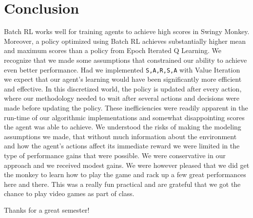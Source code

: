 \documentclass[11pt, oneside]{article}   	%
\begin{document}
\section{Conclusion}
Batch RL works well for training agents to achieve high scores in Swingy Monkey.  Moreover, a policy optimized using Batch RL achieves substantially higher mean and maximum scores than a policy from Epoch Iterated Q Learning. We recognize that we made some assumptions that constrained our ability to achieve even better performance. Had we implemented \texttt{S,A,R,S,A} with Value Iteration we expect that our agent's learning would have been significantly more efficient and effective. In this discretized world, the policy is updated after every action, where our methodology needed to wait after several actions and decisions were made before updating the policy. These inefficiencies were readily apparent in the run-time of our algorithmic implementations and somewhat disappointing scores the agent was able to achieve. We understood the risks of making the modeling assumptions we made, that without much information about the environment and how the agent's actions affect its immediate reward we were limited in the type of performance gains that were possible. We were conservative in our approach and we received modest gains. We were however pleased that we did get the monkey to learn how to play the game and rack up a few great performances here and there. This was a really fun practical and are grateful that we got the chance to play video games as part of class.

Thanks for a great semester!
\end{document}
